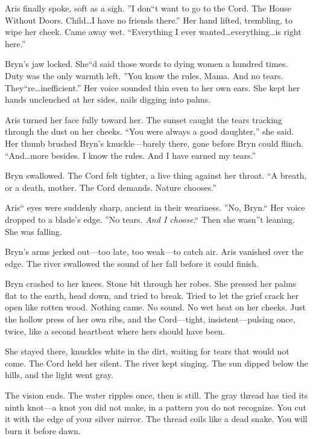 \begin{visionbox}
Aris finally spoke, soft as a sigh. ''I don``t want to go to the Cord. The House Without Doors. Child\dots I have no friends there.'' Her hand lifted, trembling, to wipe her cheek. Came away wet. ``Everything I ever wanted\dots everything\dots is right here.''

Bryn's jaw locked. She``d said those words to dying women a hundred times. Duty was the only warmth left. ''You know the rules, Mama. And no tears. They``re\dots inefficient.'' Her voice sounded thin even to her own ears. She kept her hands unclenched at her sides, nails digging into palms.

Aris turned her face fully toward her. The sunset caught the tears tracking through the dust on her cheeks. ``You were always a good daughter,'' she said. Her thumb brushed Bryn's knuckle---barely there, gone before Bryn could flinch. ``And\dots more besides. I know the rules. And I have earned my tears.''

Bryn swallowed. The Cord felt tighter, a live thing against her throat. ``A breath, or a death, mother. The Cord demands. Nature chooses.''

Aris`` eyes were suddenly sharp, ancient in their weariness. ''No, Bryn.`` Her voice dropped to a blade's edge. ''No tears. \textit{And I choose}.`` Then she wasn''t leaning. She was falling.

Bryn's arms jerked out---too late, too weak---to catch air. Aris vanished over the edge. The river swallowed the sound of her fall before it could finish.

Bryn crashed to her knees. Stone bit through her robes. She pressed her palms flat to the earth, head down, and tried to break. Tried to let the grief crack her open like rotten wood. Nothing came. No sound. No wet heat on her cheeks. Just the hollow press of her own ribs, and the Cord---tight, insistent---pulsing once, twice, like a second heartbeat where hers should have been.

She stayed there, knuckles white in the dirt, waiting for tears that would not come. The Cord held her silent. The river kept singing. The sun dipped below the hills, and the light went gray.
\end{visionbox}

\vspace{1em}

The vision ends. The water ripples once, then is still. The gray thread has tied its ninth knot---a knot you did not make, in a pattern you do not recognize. You cut it with the edge of your silver mirror. The thread coils like a dead snake. You will burn it before dawn.


